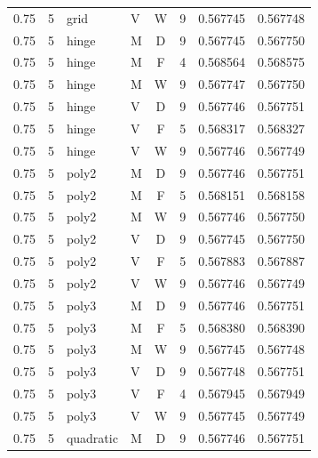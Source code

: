 \begin{longtable}{rrllcrrr}
0.75 & 5 & grid & V & W & 9 & 0.567745 & 0.567748 \\

0.75 & 5 & hinge & M & D & 9 & 0.567745 & 0.567750 \\

0.75 & 5 & hinge & M & F & 4 & 0.568564 & 0.568575 \\

0.75 & 5 & hinge & M & W & 9 & 0.567747 & 0.567750 \\

0.75 & 5 & hinge & V & D & 9 & 0.567746 & 0.567751 \\

0.75 & 5 & hinge & V & F & 5 & 0.568317 & 0.568327 \\

0.75 & 5 & hinge & V & W & 9 & 0.567746 & 0.567749 \\

0.75 & 5 & poly2 & M & D & 9 & 0.567746 & 0.567751 \\

0.75 & 5 & poly2 & M & F & 5 & 0.568151 & 0.568158 \\

0.75 & 5 & poly2 & M & W & 9 & 0.567746 & 0.567750 \\

0.75 & 5 & poly2 & V & D & 9 & 0.567745 & 0.567750 \\

0.75 & 5 & poly2 & V & F & 5 & 0.567883 & 0.567887 \\

0.75 & 5 & poly2 & V & W & 9 & 0.567746 & 0.567749 \\

0.75 & 5 & poly3 & M & D & 9 & 0.567746 & 0.567751 \\

0.75 & 5 & poly3 & M & F & 5 & 0.568380 & 0.568390 \\

0.75 & 5 & poly3 & M & W & 9 & 0.567745 & 0.567748 \\

0.75 & 5 & poly3 & V & D & 9 & 0.567748 & 0.567751 \\

0.75 & 5 & poly3 & V & F & 4 & 0.567945 & 0.567949 \\

0.75 & 5 & poly3 & V & W & 9 & 0.567745 & 0.567749 \\

0.75 & 5 & quadratic & M & D & 9 & 0.567746 & 0.567751 \\


\end{longtable}
